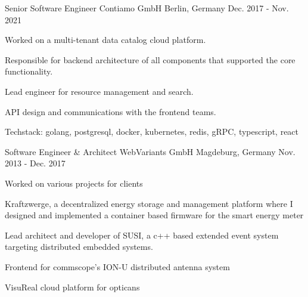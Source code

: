 


\begin{cventries}


\cventry
{Senior Software Engineer} %
{Contiamo GmbH} %
{Berlin, Germany} %
{Dec. 2017 - Nov. 2021} %
{ %
\begin{cvitems}
\item {Worked on a multi-tenant data catalog cloud platform.}
\item {Responsible for backend architecture of all components that supported the core functionality.}
\item {Lead engineer for resource management and search.}
\item {API design and communications with the frontend teams.}
\item {Techstack: golang, postgresql, docker, kubernetes, redis, gRPC, typescript, react}
\end{cvitems}
}


\cventry
{Software Engineer \& Architect} %
{WebVariants GmbH} %
{Magdeburg, Germany} %
{Nov. 2013 - Dec. 2017} %
{ %
\begin{cvitems}
\item {Worked on various projects for clients}
\item {Kraftzwerge, a decentralized energy storage and management platform where I designed and implemented a container based firmware for the smart energy meter}
\item {Lead architect and developer of SUSI, a c++ based extended event system targeting distributed embedded systems.}
\item {Frontend for commscope's ION-U distributed antenna system}
\item {VisuReal cloud platform for opticans}
\end{cvitems}
}


\end{cventries}
